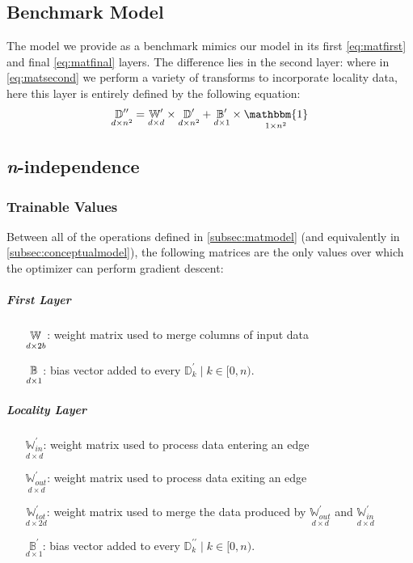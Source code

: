 \subsection{Benchmark Model}
\label{subsec:benchmark}
The model we provide as a benchmark mimics our model in its first 
\eqref{eq:matfirst} and final \eqref{eq:matfinal} layers. The difference lies in 
the second layer: where in \eqref{eq:matsecond} we perform a variety of 
transforms to incorporate locality data, here this layer is entirely defined by 
the following equation:
\begin{equation}
	\label{eq:benchsecond}
	\underset{d \times n^2}{\mathbb{D}^{\prime\prime}} = \underset{d \times 
	d}{\mathbb{W}^\prime} \times \underset{d \times n^2}{\mathbb{D}^\prime} + 
	\underset{d \times 1}{\mathbb{B}^\prime} \times \underset{1 \times 
	n^2}{\mathbbm{1}}
\end{equation}

\subsection{\textit{n}-independence}
\label{subsec:nindependence}
\subsubsection{Trainable Values}
Between all of the operations defined in \ref{subsec:matmodel} (and equivalently 
in \ref{subsec:conceptualmodel}), the following matrices are the only values 
over which the optimizer can perform gradient descent:
\subparagraph{First Layer}
\begin{itemize}
	\item[$\ubb{W}{d}{2b}$:] weight matrix used to merge columns of input data
	\item[$\ubb{B}{d}{1}$:] bias vector added to every $\mathbb{D}^\prime_k \mid 
		k \in [0,n)$.
\end{itemize}

\subparagraph{Locality Layer}
\begin{itemize}
	\item[$\underset{d \times d}{\mathbb{W}_{in}^\prime}$:] weight matrix used 
		to process data entering an edge
	\item[$\underset{d \times d}{\mathbb{W}_{out}^\prime}$:] weight matrix used 
		to process data exiting an edge
	\item[$\underset{d \times 2d}{\mathbb{W}_{tot}^\prime}$:] weight matrix used 
		to merge the data produced by $\underset{d \times 
			d}{\mathbb{W}_{out}^\prime}$ and $\underset{d \times
			d}{\mathbb{W}_{in}^\prime}$
	\item[$\underset{d \times 1}{\mathbb{B}^\prime}$:] bias vector added to 
		every $\mathbb{D}^{\prime\prime}_k \mid k \in [0,n)$.
\end{itemize}

